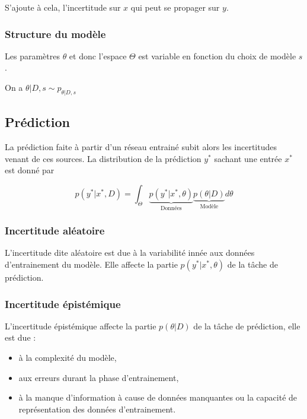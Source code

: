 \documentclass[french,12pt]{article}
\let\oldsubsection\subsection%
\renewcommand{\subsection}{%
  \renewcommand{\theequation}{\thesubsection.\arabic{equation}}%
  \oldsubsection}%
\begin{document}
S'ajoute à cela, l'incertitude sur $x$ qui peut se propager sur $y$.

\subsubsection{Structure du modèle}

Les paramètres $\theta$ et donc l'espace $\Theta$ est variable en fonction du choix de modèle $s$.

On a $\theta | D,s \sim p_{\theta | D, s}$

\subsection{Prédiction}

La prédiction faite à partir d'un réseau entrainé subit alors les incertitudes venant
de ces sources. La distribution de la prédiction $y^*$ sachant une entrée $x^*$ est donné par

\begin{equation}
    p(y^* | x^*, D) = \int_{\Theta} \underbrace{p(y^* | x^*, \theta)}_{\text{Données}} \underbrace{p(\theta  | D)}_{\text{Modèle}} d \theta 
\end{equation}

\subsubsection{Incertitude aléatoire}

L'incertitude dite aléatoire est due à la variabilité innée aux données d'entrainement
du modèle. Elle affecte la partie $p(y^* | x^*, \theta)$ de la tâche de prédiction.

\subsubsection{Incertitude épistémique}

L'incertitude épistémique affecte la partie $p(\theta  | D)$ de la tâche de prédiction,
elle est due :

\begin{itemize}
    \item à la complexité du modèle,
    \item aux erreurs durant la phase d'entrainement,
    \item à la manque d'information à cause de données manquantes
          ou la capacité de représentation des données d'entrainement.
\end{itemize}
\end{document}
